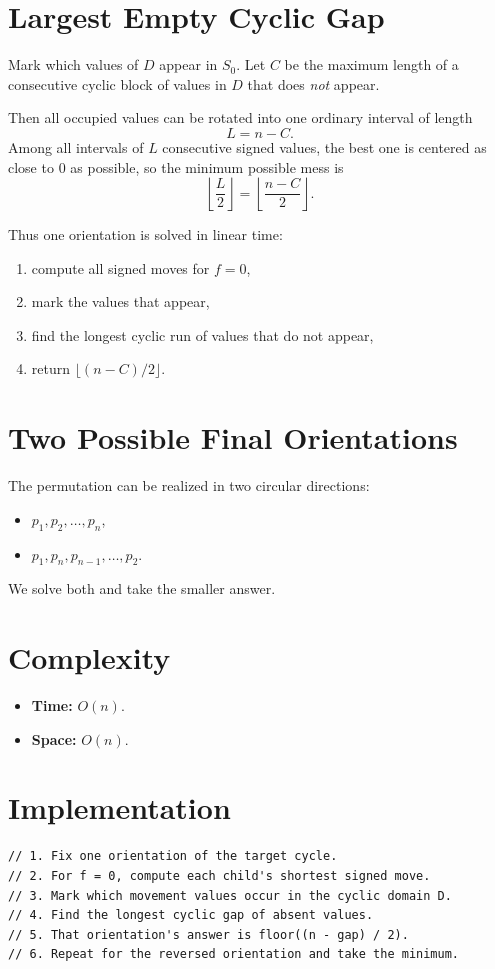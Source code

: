 \documentclass[11pt,a4paper]{article}
\begin{document}
\section{Largest Empty Cyclic Gap}
Mark which values of $D$ appear in $S_0$.
Let $C$ be the maximum length of a consecutive cyclic block of values in $D$ that does \emph{not}
appear.

Then all occupied values can be rotated into one ordinary interval of length
\[
L = n - C.
\]
Among all intervals of $L$ consecutive signed values, the best one is centered as close to $0$ as
possible, so the minimum possible mess is
\[
\left\lfloor \frac{L}{2} \right\rfloor
=
\left\lfloor \frac{n-C}{2} \right\rfloor.
\]

Thus one orientation is solved in linear time:
\begin{enumerate}
  \item compute all signed moves for $f=0$,
  \item mark the values that appear,
  \item find the longest cyclic run of values that do not appear,
  \item return $\lfloor (n-C)/2 \rfloor$.
\end{enumerate}

\section{Two Possible Final Orientations}
The permutation can be realized in two circular directions:
\begin{itemize}
  \item $p_1, p_2, \dots, p_n$,
  \item $p_1, p_n, p_{n-1}, \dots, p_2$.
\end{itemize}
We solve both and take the smaller answer.

\section{Complexity}
\begin{itemize}
  \item \textbf{Time:} $O(n)$.
  \item \textbf{Space:} $O(n)$.
\end{itemize}

\section{Implementation}
\begin{lstlisting}
// 1. Fix one orientation of the target cycle.
// 2. For f = 0, compute each child's shortest signed move.
// 3. Mark which movement values occur in the cyclic domain D.
// 4. Find the longest cyclic gap of absent values.
// 5. That orientation's answer is floor((n - gap) / 2).
// 6. Repeat for the reversed orientation and take the minimum.
\end{lstlisting}
\end{document}
